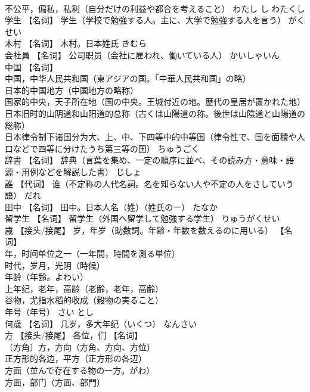 \documentclass[8pt]{extreport}
\begin{document}
\begin{CJK}{UTF8}{min}
\\	不公平，偏私，私利（自分だけの利益や都合を考えること）	わたし し わたくし	
\\	学生	【名词】 学生（学校で勉強する人。主に、大学で勉強する人を言う）	がくせい	
\\	木村	【名词】 木村。日本姓氏	きむら	
\\	会社員	【名词】 公司职员（会社に雇われ、働いている人）	かいしゃいん	
\\	中国	【名词】 
\\	中国，中华人民共和国（東アジアの国。「中華人民共和国」の略） 
\\	日本的中国地方（中国地方の略称） 
\\	国家的中央，天子所在地（国の中央。王城付近の地。歴代の皇居が置かれた地） 
\\	日本旧时的山阴道和山阳道的总称（古くは山陽道の称。後世は山陰道と山陽道の総称） 
\\	日本律令制下诸国分为大、上、中、下四等中的中等国（律令性で、国を面積や人口などで四等に分けたうち第三等の国）	ちゅうごく	
\\	辞書	【名词】 辞典（言葉を集め、一定の順序に並べ、その読み方・意味・語源・用例などを解説した書）	じしょ	
\\	誰	【代词】 谁（不定称の人代名詞。名を知らない人や不定の人をさしていう語）	だれ	
\\	田中	【名词】 田中。日本人名（姓）（姓氏の一）	たなか	
\\	留学生	【名词】 留学生（外国へ留学して勉強する学生）	りゅうがくせい	
\\	歳	【接头/接尾】 岁，年岁（助数詞。年齢・年数を数えるのに用いる） 【名词】 
\\	年，时间单位之一（一年間，時間を測る単位） 
\\	时代，岁月，光阴（時候） 
\\	年龄（年齢。よわい） 
\\	上年纪，老年，高龄（老齢，老年，高齢） 
\\	谷物，尤指水稻的收成（穀物の実ること） 
\\	年号（年号）	さい とし	
\\	何歳	【名词】 几岁，多大年纪（いくつ）	なんさい	
\\	方	【接头/接尾】 各位，们 【名词】 
\\	〔方角〕方，方向（方角、方向、方位） 
\\	正方形的各边，平方（正方形の各辺） 
\\	方面（並んで存在する物の一方。がわ） 
\\	方面，部门（方面、部門） 

\end{CJK}
\end{document}
